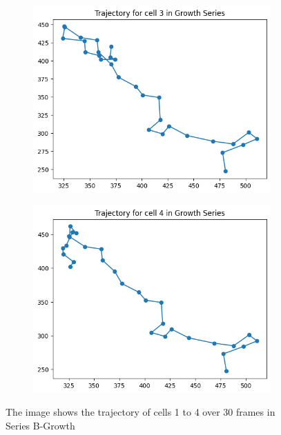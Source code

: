 \documentclass{article}
\begin{document}
\begin{figure}[h!]
\begin{subfigure}[b]{0.5\linewidth}
    \end{subfigure}
    \begin{subfigure}[b]{0.5\linewidth}
        \centering
        \includegraphics[width=\linewidth]{Report/Appendix_Images/Trajectory-B-Growth/trajectory_3.png}    
    \end{subfigure}%
    \begin{subfigure}[b]{0.5\linewidth}
        \centering
        \includegraphics[width=\linewidth]{Report/Appendix_Images/Trajectory-B-Growth/trajectory_4.png}
    \end{subfigure}
    \caption{The image shows the trajectory of cells 1 to 4 over 30 frames in Series B-Growth}
    \label{fig:Trajectory-GrowthSeries-1-4}
\end{figure}
\end{document}
